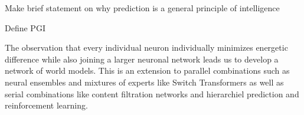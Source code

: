 
Make brief statement on why prediction is a general principle of intelligence

Define PGI 

The observation that every individual neuron individually minimizes energetic difference while also joining a larger neuronal network leads us to develop a network of world models. This is an extension to parallel combinations such as neural ensembles and mixtures of experts \cite{Shazeer2017} like Switch Transformers as well as serial combinations like content filtration networks and hierarchiel prediction and reinforcement learning.
